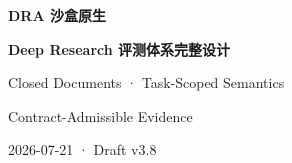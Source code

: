 \documentclass[UTF8,a4paper,10.5pt]{ctexart}
\begin{document}
\begin{titlepage}
  \centering
  \vspace*{3cm}
  {\Huge\bfseries\color{DraBlue}DRA 沙盒原生\par}
  \vspace{0.5cm}
  {\LARGE\bfseries Deep Research 评测体系完整设计\par}
  \vspace{1.2cm}
  {\Large Closed Documents · Task-Scoped Semantics\par}
  \vspace{0.25cm}
  {\Large Contract-Admissible Evidence\par}
  \vfill
  {\large 2026-07-21 · Draft v3.8\par}
  \vspace{1cm}
\end{titlepage}
\tableofcontents
\clearpage
{}
\end{document}
